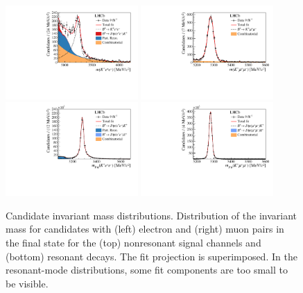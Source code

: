\begin{figure}[!t]
    \centering
    \includegraphics[width=0.45\textwidth]{figures/Fig2a.pdf}
    \includegraphics[width=0.45\textwidth]{figures/Fig2b.pdf}
    \includegraphics[width=0.45\textwidth]{figures/Fig2c.pdf}
    \includegraphics[width=0.45\textwidth]{figures/Fig2d.pdf}
    \caption{Candidate invariant mass distributions. Distribution of the invariant mass \mKllgeneric for candidates with (left) electron and (right) muon pairs in the final state for the (top) nonresonant \BuKll signal channels and (bottom) resonant \BuJpsiKll decays. The fit projection is superimposed. In the resonant-mode distributions, some fit components are too small to be visible.
    }
    \label{fig:fits}
\end{figure}



